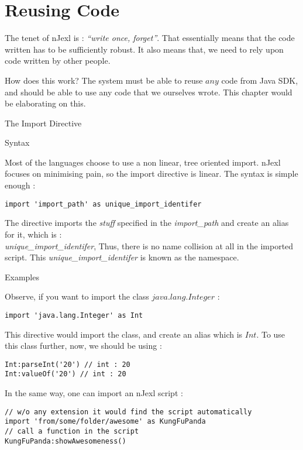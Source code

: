 \chapter{Reusing Code}\label{code-reuse}

{\LARGE T}he tenet of nJexl is : \emph{``write once, forget''}.
That essentially means that the code written has to be sufficiently robust.
It also means that, we need to rely upon code written by other people.

How does this work? The system must be able to reuse $any$ code 
from Java SDK, and should be able to use any code that we ourselves wrote.
This chapter would be elaborating on this.

\begin{section}{The Import Directive}

\begin{subsection}{Syntax}

Most of the languages choose to use a non linear, tree oriented import.
nJexl focuses on minimising pain, so the import directive is linear.
The syntax is simple enough :
\begin{lstlisting}[style=JexlStyle]
import 'import_path' as unique_import_identifer
\end{lstlisting}

The directive imports the \emph{stuff} specified in the \emph{import\_path} and create 
an alias for it, which is : \\ \emph{unique\_import\_identifer},
Thus, there is no name collision at all in the imported script.
This \emph{unique\_import\_identifer} is known as the namespace.

\end{subsection}

 
\begin{subsection}{Examples}

Observe, if you want to import the class $java.lang.Integer$ :

\begin{lstlisting}[style=JexlStyle]
import 'java.lang.Integer' as Int
\end{lstlisting}

This directive would import the class, and create an alias which is $Int$.
To use this class further, now, we should be using :

\begin{lstlisting}[style=JexlStyle]
Int:parseInt('20') // int : 20
Int:valueOf('20') // int : 20 
\end{lstlisting}

In the same way, one can import an nJexl script :

\begin{lstlisting}[style=JexlStyle]
// w/o any extension it would find the script automatically 
import 'from/some/folder/awesome' as KungFuPanda
// call a function in the script 
KungFuPanda:showAwesomeness()
\end{lstlisting}

\end{subsection}
 
\end{section}

